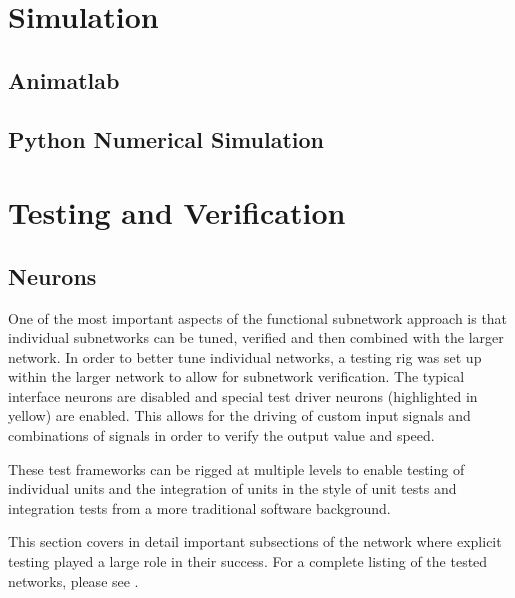 \section{Simulation}

\subsection{Animatlab}

\subsection{Python Numerical Simulation}

\section{Testing and Verification}

\subsection{Neurons}

One of the most important aspects of the functional subnetwork approach is that
individual subnetworks can be tuned, verified and then combined with the larger
network. In order to better tune individual networks, a testing rig was set up
within the larger network to allow for subnetwork verification. The typical
interface neurons are disabled and special test driver neurons (highlighted in
yellow) are enabled. This allows for the driving of custom input signals and
combinations of signals in order to verify the output value and speed.


These test frameworks can be rigged at multiple levels to enable testing of
individual units and the integration of units in the style of unit tests and
integration tests from a more traditional software background.



This section covers in detail important subsections of the network where
explicit testing played a large role in their success. For a complete listing of
the tested networks, please see .
